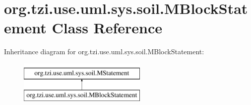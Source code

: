 \hypertarget{classorg_1_1tzi_1_1use_1_1uml_1_1sys_1_1soil_1_1_m_block_statement}{\section{org.\-tzi.\-use.\-uml.\-sys.\-soil.\-M\-Block\-Statement Class Reference}
\label{classorg_1_1tzi_1_1use_1_1uml_1_1sys_1_1soil_1_1_m_block_statement}
}
Inheritance diagram for org.\-tzi.\-use.\-uml.\-sys.\-soil.\-M\-Block\-Statement\-:\begin{figure}[H]
\begin{center}
\leavevmode
\includegraphics[height=2.000000cm]{classorg_1_1tzi_1_1use_1_1uml_1_1sys_1_1soil_1_1_m_block_statement}
\end{center}
\end{figure}
